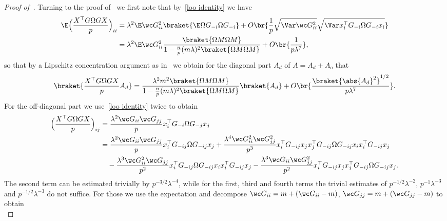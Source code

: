 \begin{proof}[Proof of~]
    Turning to the proof of~ we first note that by~\cref{loo identity} we have
    \begin{equation}
        \begin{split}
            \E\Bigl(\frac{X^\top G\Omega GX}{p}\Bigr)_{ii} &= \lambda^2 \E\wc G_{ii}^2 \braket{\E\Omega G_{-i}\Omega G_{-i}} + O\br{\frac{1}{p}\sqrt{\Var \wc G_{ii}^2 } \sqrt{\Var x_i^\top G_{-i}\Omega G_{-i} x_i}}\\
            &= \lambda^2 \E \wc G_{ii}^2 \frac{\braket{ \Omega M \Omega M}}{1- \frac{n}{p}(m\lambda)^2 \braket{\Omega M \Omega M}} + O\br{\frac{1}{p\lambda^7}},
        \end{split}
    \end{equation}
    so that by a Lipschitz concentration argument as in~ we obtain for the diagonal part $A_d$ of $A=A_d+A_o$ that
    \begin{equation}
        \braket{\frac{X^\top G\Omega GX}{p}A_d} = \frac{\lambda^2m^2  \braket{ \Omega M \Omega M}}{1- \frac{n}{p}(m\lambda)^2 \braket{\Omega M \Omega M}}\braket{A_d} + O\br{\frac{\braket{\abs{A_d}^2}^{1/2}}{p\lambda^7}}.
    \end{equation}
    For the off-diagonal part we use~\cref{loo identity} twice to obtain
    \begin{equation}
        \begin{split}
            \Bigl(\frac{X^\top G\Omega GX}{p}\Bigr)_{ij} &= \frac{\lambda^{2}\wc G_{ii}\wc G_{jj}}{p} x_i^\top G_{-i}\Omega G_{-j} x_j\\
            & = \frac{\lambda^{2}\wc G_{ii}\wc G_{jj}}{p} x_i^\top G_{-ij}\Omega G_{-ij} x_j + \frac{\lambda^{4}\wc G_{ii}^2\wc G_{jj}^2}{p^3} x_i^\top G_{-ij} x_jx_j^\top G_{-ij}\Omega G_{-ij} x_ix_i^\top G_{-ij} x_j\\
            &\quad - \frac{\lambda^{3}\wc G_{ii}^2\wc G_{jj}}{p^2} x_i^\top G_{-ij}\Omega G_{-ij}x_ix_i^\top G_{-ij} x_j  - \frac{\lambda^{3}\wc G_{ii}\wc G_{jj}^2}{p^2} x_i^\top G_{-ij}x_jx_j^\top G_{-ij}\Omega G_{-ij} x_j.
        \end{split}
    \end{equation}
    The second term can be estimated trivially by $p^{-3/2}\lambda^{-4}$, while for the first, third and fourth terms the trivial estimates of $p^{-1/2}\lambda^{-2}$, $p^{-1} \lambda^{-3}$ and $p^{-1/2}\lambda^{-3}$ do not suffice. For those we use the expectation and decompose $\wc G_{ii}=m+(\wc G_{ii}-m)$, $\wc G_{jj}=m+(\wc G_{jj}-m)$ to obtain
    \begin{equation}

\end{equation}
\end{proof}
